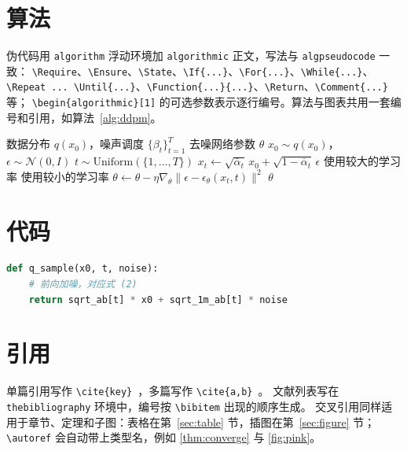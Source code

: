 \section{算法}\label{sec:alg}
伪代码用 \texttt{algorithm} 浮动环境加 \texttt{algorithmic} 正文，写法与 \texttt{algpseudocode} 一致：
\verb|\Require|、\verb|\Ensure|、\verb|\State|、\verb|\If{...}|、\verb|\For{...}|、\verb|\While{...}|、
\verb|\Repeat ... \Until{...}|、\verb|\Function{...}{...}|、\verb|\Return|、\verb|\Comment{...}| 等；
\verb|\begin{algorithmic}[1]| 的可选参数表示逐行编号。算法与图表共用一套编号和引用，如算法~\ref{alg:ddpm}。

\begin{algorithm}[H]
  \caption{DDPM 训练（简化）}\label{alg:ddpm}
  \begin{algorithmic}[1]
    \Require 数据分布 $q(x_0)$，噪声调度 $\{\beta_t\}_{t=1}^{T}$
    \Ensure 去噪网络参数 $\theta$
    \Repeat
      \State $x_0 \sim q(x_0)$，$\epsilon \sim \mathcal{N}(0, I)$
      \State $t \sim \mathrm{Uniform}(\{1, \dots, T\})$ 
      \State $x_t \gets \sqrt{\bar\alpha_t}\,x_0 + \sqrt{1-\bar\alpha_t}\,\epsilon$
        \State 使用较大的学习率
      \Else
        \State 使用较小的学习率
      \EndIf
      \State $\theta \gets \theta - \eta \nabla_\theta \|\epsilon - \epsilon_\theta(x_t, t)\|^2$
    \State \Return $\theta$
  \end{algorithmic}
\end{algorithm}

\section{代码}\label{sec:code}
\begin{lstlisting}[language=python]
def q_sample(x0, t, noise):
    # 前向加噪，对应式 (2)
    return sqrt_ab[t] * x0 + sqrt_1m_ab[t] * noise
\end{lstlisting}

\section{引用}\label{sec:cite}
单篇引用写作 \verb|\cite{key}|~\cite{wang2020cnn}，多篇写作 \verb|\cite{a,b}|~\cite{ojha2023towards,tan2024rethinking}。
文献列表写在 \texttt{thebibliography} 环境中，编号按 \verb|\bibitem| 出现的顺序生成。
交叉引用同样适用于章节、定理和子图：表格在第~\ref{sec:table} 节，插图在第~\ref{sec:figure} 节；\verb|\autoref| 会自动带上类型名，例如 \autoref{thm:converge} 与 \autoref{fig:pink}。

